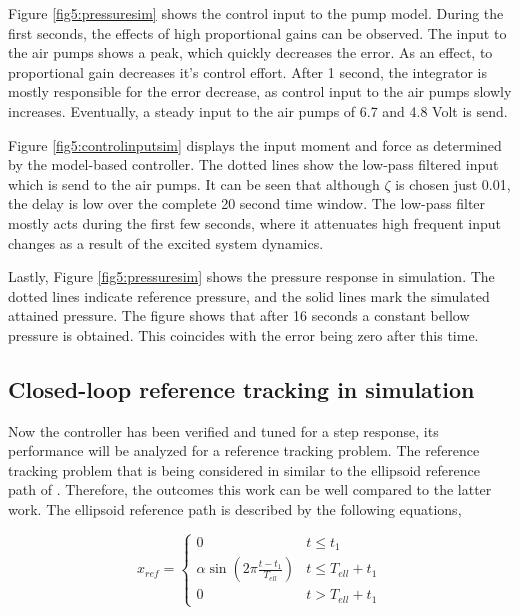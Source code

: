 Figure \ref{fig5:pressuresim} shows the control input to the pump model. During the first seconds, the effects of high proportional gains can be observed. The input to the air pumps shows a peak, which quickly decreases the error. As an effect, to proportional gain decreases it's control effort. After 1 second, the integrator is mostly responsible for the error decrease, as control input to the air pumps slowly increases. Eventually, a steady input to the air pumps of 6.7 and 4.8 Volt is send. 

Figure \ref{fig5:controlinputsim} displays the input moment and force as determined by the model-based controller. The dotted lines show the low-pass filtered input which is send to the air pumps. It can be seen that although $\zeta$ is chosen just 0.01, the delay is low over the complete 20 second time window. The low-pass filter mostly acts during the first few seconds, where it attenuates high frequent input changes as a result of the excited system dynamics. 

Lastly, Figure \ref{fig5:pressuresim} shows the pressure response in simulation. The dotted lines indicate reference pressure, and the solid lines mark the simulated attained pressure. The figure shows that after 16 seconds a constant bellow pressure is obtained. This coincides with the error being zero after this time.



\subsection*{Closed-loop reference tracking in simulation}

Now the controller has been verified and tuned for a step response, its performance will be analyzed for a reference tracking problem. The reference tracking problem that is being considered in similar to the ellipsoid reference path of \cite{berkers}. Therefore, the outcomes this work can be well compared to the latter work. The ellipsoid reference path is described by the following equations,

\begin{equation}
    x_{ref} = \begin{cases} 
      0 &  t \leq t_1 \\
     \alpha \sin(2\pi \frac{t - t_1}{T_{ell}}) & t \leq T_{ell} + t_1 \\
     0 & t > T_{ell} + t_1
   \end{cases} 
\end{equation}

